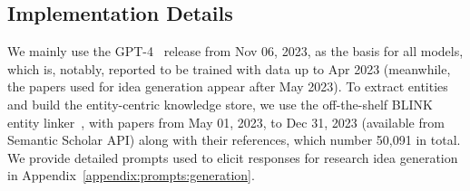 \subsection{Implementation Details}
We mainly use the GPT-4~\cite{GPT-4} release from Nov 06, 2023, as the basis for all models, which is, notably, reported to be trained with data up to Apr 2023 (meanwhile, the papers used for idea generation appear after May 2023). To extract entities and build the entity-centric knowledge store, we use the off-the-shelf BLINK entity linker~\cite{blink}, with papers from May 01, 2023, to Dec 31, 2023 (available from Semantic Scholar API) along with their references, which number 50,091 in total. We provide detailed prompts used to elicit responses for research idea generation in Appendix~\ref{appendix:prompts:generation}.


